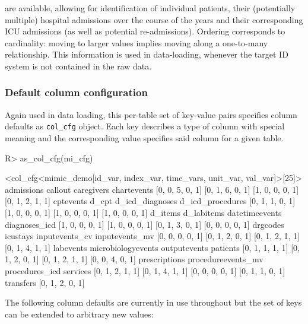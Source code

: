 \documentclass[
  notitle]{jss}
\begin{document}
are available, allowing for identification of individual patients, their
(potentially multiple) hospital admissions over the course of the years
and their corresponding ICU admissions (as well as potential
re-admissions). Ordering corresponds to cardinality: moving to larger
values implies moving along a one-to-many relationship. This information
is used in data-loading, whenever the target ID system is not contained
in the raw data.

\hypertarget{default-column-configuration}{%
\subsubsection{Default column
configuration}\label{default-column-configuration}}

Again used in data loading, this per-table set of key-value pairs
specifies column defaults as \texttt{col\_cfg} object. Each key
describes a type of column with special meaning and the corresponding
value specifies said column for a given table.

\begin{CodeChunk}
\begin{CodeInput}
R> as_col_cfg(mi_cfg)
\end{CodeInput}
\begin{CodeOutput}
<col_cfg<mimic_demo[id_var, index_var, time_vars, unit_var, val_var]>[25]>
        admissions            callout         caregivers        chartevents 
   [0, 0, 5, 0, 1]    [0, 1, 6, 0, 1]    [1, 0, 0, 0, 1]    [0, 1, 2, 1, 1] 
         cptevents              d_cpt    d_icd_diagnoses   d_icd_procedures 
   [0, 1, 1, 0, 1]    [1, 0, 0, 0, 1]    [1, 0, 0, 0, 1]    [1, 0, 0, 0, 1] 
           d_items         d_labitems     datetimeevents      diagnoses_icd 
   [1, 0, 0, 0, 1]    [1, 0, 0, 0, 1]    [0, 1, 3, 0, 1]    [0, 0, 0, 0, 1] 
          drgcodes           icustays     inputevents_cv     inputevents_mv 
   [0, 0, 0, 0, 1]    [0, 1, 2, 0, 1]    [0, 1, 2, 1, 1]    [0, 1, 4, 1, 1] 
         labevents microbiologyevents       outputevents           patients 
   [0, 1, 1, 1, 1]    [0, 1, 2, 0, 1]    [0, 1, 2, 1, 1]    [0, 0, 4, 0, 1] 
     prescriptions procedureevents_mv     procedures_icd           services 
   [0, 1, 2, 1, 1]    [0, 1, 4, 1, 1]    [0, 0, 0, 0, 1]    [0, 1, 1, 0, 1] 
         transfers 
   [0, 1, 2, 0, 1] 
\end{CodeOutput}
\end{CodeChunk}

The following column defaults are currently in use throughout 
but the set of keys can be extended to arbitrary new values:
\end{document}
